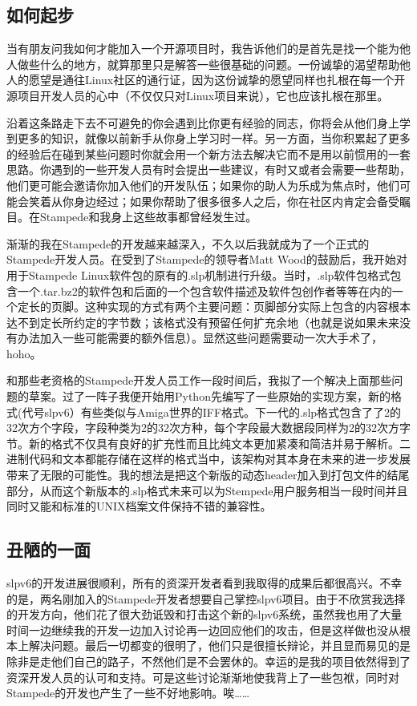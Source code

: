 \subsection{如何起步}

当有朋友问我如何才能加入一个开源项目时，我告诉他们的是首先是找一个能为他人做些什么的地方，就算那里只是解答一些很基础的问题。一份诚挚的渴望帮助他人的愿望是通往Linux社区的通行证，因为这份诚挚的愿望同样也扎根在每一个开源项目开发人员的心中（不仅仅只对Linux项目来说），它也应该扎根在那里。

沿着这条路走下去不可避免的你会遇到比你更有经验的同志，你将会从他们身上学到更多的知识，就像以前新手从你身上学习时一样。另一方面，当你积累起了更多的经验后在碰到某些问题时你就会用一个新方法去解决它而不是用以前惯用的一套思路。你遇到的一些开发人员有时会提出一些建议，有时又或者会需要一些帮助，他们更可能会邀请你加入他们的开发队伍；如果你的助人为乐成为焦点时，他们可能会笑着从你身边经过；如果你帮助了很多很多人之后，你在社区内肯定会备受瞩目。在Stampede和我身上这些故事都曾经发生过。

渐渐的我在Stampede的开发越来越深入，不久以后我就成为了一个正式的Stampede开发人员。在受到了Stampede的领导者Matt Wood的鼓励后，我开始对用于Stampede Linux软件包的原有的.slp机制进行升级。当时，.slp软件包格式包含一个.tar.bz2的软件包和后面的一个包含软件描述及软件包创作者等等在内的一个定长的页脚。这种实现的方式有两个主要问题：页脚部分实际上包含的内容根本达不到定长所约定的字节数；该格式没有预留任何扩充余地（也就是说如果未来没有办法加入一些可能需要的额外信息）。显然这些问题需要动一次大手术了，hoho。

和那些老资格的Stampede开发人员工作一段时间后，我拟了一个解决上面那些问题的草案。过了一阵子我便开始用Python先编写了一些原始的实现方案，新的格式(代号slpv6）有些类似与Amiga世界的IFF格式。下一代的.slp格式包含了了2的32次方个字段，字段种类为2的32次方种，每个字段最大数据段同样为2的32次方字节。新的格式不仅具有良好的扩充性而且比纯文本更加紧凑和简洁并易于解析。二进制代码和文本都能存储在这样的格式当中，该架构对其本身在未来的进一步发展带来了无限的可能性。我的想法是把这个新版的动态header加入到打包文件的结尾部分，从而这个新版本的.slp格式未来可以为Stempede用户服务相当一段时间并且同时又能和标准的UNIX档案文件保持不错的兼容性。

\subsection{丑陋的一面}

slpv6的开发进展很顺利，所有的资深开发者看到我取得的成果后都很高兴。不幸的是，两名刚加入的Stampede开发者想要自己掌控slpv6项目。由于不欣赏我选择的开发方向，他们花了很大劲诋毁和打击这个新的slpv6系统，虽然我也用了大量时间一边继续我的开发一边加入讨论再一边回应他们的攻击，但是这样做也没从根本上解决问题。最后一切都变的很明了，他们只是很擅长辩论，并且显而易见的是除非是走他们自己的路子，不然他们是不会罢休的。幸运的是我的项目依然得到了资深开发人员的认可和支持。可是这些讨论渐渐地使我背上了一些包袱，同时对Stampede的开发也产生了一些不好地影响。唉……

